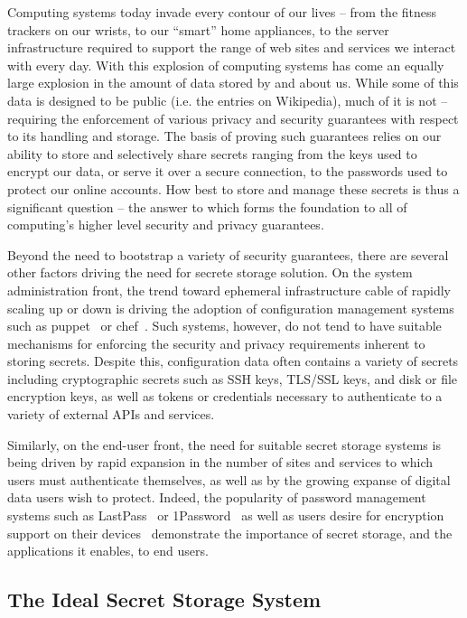Computing systems today invade every contour of our lives -- from the 
fitness trackers on our wrists, to our ``smart'' home appliances, to 
the server infrastructure required to support the range of web sites 
and services we interact with every day. With this explosion of 
computing systems has come an equally large explosion in the amount of 
data stored by and about us. While some of this data is designed to be 
public (i.e. the entries on Wikipedia), much of it is not -- requiring 
the enforcement of various privacy and security guarantees with 
respect to its handling and storage. The basis of proving such 
guarantees relies on our ability to store and selectively share 
secrets ranging from the keys used to encrypt our data, or serve it 
over a secure connection, to the passwords used to protect our online 
accounts. How best to store and manage these secrets is thus a
significant question -- the answer to which forms the foundation to
all of computing's higher level security and privacy guarantees.

Beyond the need to bootstrap a variety of security guarantees, there
are several other factors driving the need for secrete storage
solution. On the system administration front, the trend toward
ephemeral infrastructure cable of rapidly scaling up or down is
driving the adoption of configuration management systems such as
puppet~\cite{puppet} or chef~\cite{chef}. Such systems, however, do
not tend to have suitable mechanisms for enforcing the security and
privacy requirements inherent to storing secrets. Despite this,
configuration data often contains a variety of secrets including
cryptographic secrets such as SSH keys, TLS/SSL keys, and disk or file
encryption keys, as well as tokens or credentials necessary to
authenticate to a variety of external APIs and services.

Similarly, on the end-user front, the need for suitable secret storage
systems is being driven by rapid expansion in the number of sites and
services to which users must authenticate themselves, as well as by
the growing expanse of digital data users wish to protect. Indeed, the
popularity of password management systems such as
LastPass~\cite{lastpass} or 1Password~\cite{onepassword} as well as
users desire for encryption support on their
devices~\cite{intercept-cookencryption} demonstrate the importance of
secret storage, and the applications it enables, to end users.

\subsection{The Ideal Secret Storage System}

